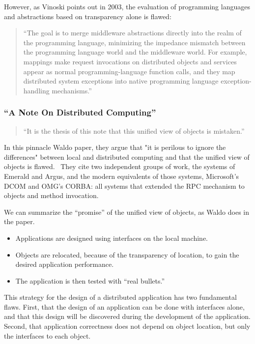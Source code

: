 However, as Vinoski points out in 2003, the evaluation of programming languages and abstractions based on transparency alone is flawed:

\begin{quote}
``The goal is to merge middleware abstractions directly into the realm of the programming language, minimizing the impedance mismatch between the programming language world and the middleware world. For example, mappings make request invocations on distributed objects and services appear as normal programming-language function calls, and they map distributed system exceptions into native programming language exception-handling mechanisms.''~\cite{vinoski2003s}
\end{quote}

\subsubsection{``A Note On Distributed Computing''}

\begin{quote}
``It is the thesis of this note that this unified view of objects is mistaken.''~\cite{kendall1994note}
\end{quote}

In this pinnacle Waldo paper, they argue that "it is perilous to ignore the differences" between local and distributed computing and that the unified view of objects is flawed.~\cite{kendall1994note}  They cite two independent groups of work, the systems of Emerald and Argus, and the modern equivalents of those systems, Microsoft's DCOM and OMG's CORBA: all systems that  extended the RPC mechanism to objects and method invocation.

We can summarize the ``promise'' of the unified view of objects, as Waldo does in the paper.

\begin{itemize}
\item Applications are designed using interfaces on the local machine.
\item Objects are relocated, because of the transparency of location, to gain the desired application performance.
\item The application is then tested with ``real bullets.''
\end{itemize}

This strategy for the design of a distributed application has two fundamental flaws.  First, that the design of an application can be done with interfaces alone, and that this design will be discovered during the development of the application.  Second, that application correctness does not depend on object location, but only the interfaces to each object.

